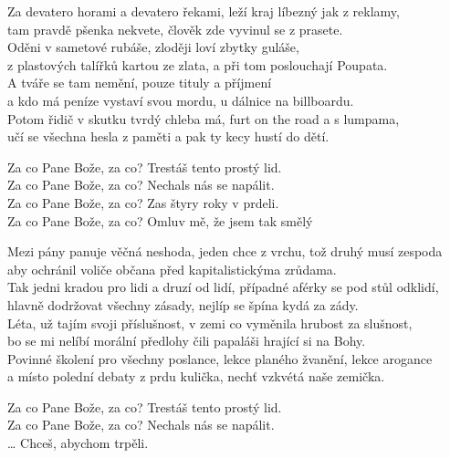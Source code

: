 \thispagestyle{empty}

\vspace*{-5pt}
\begin{small}
\ve{}
Za devatero horami a devatero řekami, leží kraj líbezný jak z reklamy,\\
tam pravdě pšenka nekvete, člověk zde vyvinul se z prasete.\\
Oděni v sametové rubáše, zloději loví zbytky guláše,\\
z plastových talířků kartou ze zlata, a při tom poslouchají Poupata.\\
A tváře se tam nemění, pouze tituly a příjmení\\
a kdo má peníze vystaví svou mordu, u dálnice na billboardu.\\
Potom řidič v skutku tvrdý chleba má, furt on the road a s lumpama,\\
učí se všechna hesla z paměti a pak ty kecy hustí do dětí.
\vspace*{-3pt}

\cho{}
Za co Pane Bože, za co? Trestáš tento prostý lid.\\
Za co Pane Bože, za co? Nechals nás se napálit.\\
Za co Pane Bože, za co? Zas štyry roky v prdeli.\\
Za co Pane Bože, za co? Omluv mě, že jsem tak smělý
\vspace*{-3pt}

\ve{}
Mezi pány panuje věčná neshoda, jeden chce z vrchu, tož druhý musí zespoda\\
aby ochránil voliče občana před kapitalistickýma zrůdama.\\
Tak jedni kradou pro lidi a druzí od lidí, případné aférky se pod stůl odklidí,\\
hlavně dodržovat všechny zásady, nejlíp se špína kydá za zády.\\
Léta, už tajím svoji příslušnost, v zemi co vyměnila hrubost za slušnost,\\
bo se mi nelíbí morální předlohy čili papaláši hrající si na Bohy.\\
Povinné školení pro všechny poslance, lekce planého žvanění, lekce arogance\\
a místo polední debaty z prdu kulička, nechť vzkvétá naše zemička.
\vspace*{-3pt}

\cho{}
Za co Pane Bože, za co? Trestáš tento prostý lid.\\
Za co Pane Bože, za co? Nechals nás se napálit.\\
\ldots{} Chceš, abychom trpěli. 
\vspace*{-3pt}


\end{small}
